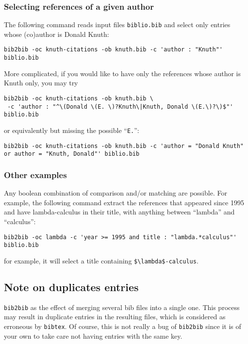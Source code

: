 \documentclass[11pt,a4paper]{article}
\begin{document}
\subsubsection{Selecting references of a given author}

The following command reads input files \verb|biblio.bib| and select
only entries whose (co)author is Donald Knuth: 
\begin{verbatim}
bib2bib -oc knuth-citations -ob knuth.bib -c 'author : "Knuth"' biblio.bib
\end{verbatim}
More complicated, if you would like to have only the references whose
author is Knuth only, you may try
\begin{verbatim}
bib2bib -oc knuth-citations -ob knuth.bib \
 -c 'author : "^\(Donald \(E. \)?Knuth\|Knuth, Donald \(E.\)?\)$"' biblio.bib
\end{verbatim}
or equivalently but missing the possible ``\verb|E.|'':
\begin{verbatim}
bib2bib -oc knuth-citations -ob knuth.bib -c 'author = "Donald Knuth"
or author = "Knuth, Donald"' biblio.bib
\end{verbatim}

\subsubsection{Other examples}

Any boolean combination of comparison and/or matching are
possible. For example, the following command extract the references
that appeared since 1995 and have lambda-calculus in their title, with
anything between ``lambda'' and ``calculus'':
\begin{verbatim}
bib2bib -oc lambda -c 'year >= 1995 and title : "lambda.*calculus"' biblio.bib
\end{verbatim}
for example, it will select a title containing
\verb|$\lambda$-calculus|. 

\subsection{Note on duplicates entries}
 
\verb|bib2bib| as the effect of merging several bib files into a
single one. This process may result in duplicate entries in the
resulting files, which is considered as erroneous by \verb|bibtex|.  
Of course, this is not really a bug of \verb|bib2bib| since it is of
your own to take care not having entries with the same key. 
\end{document}
